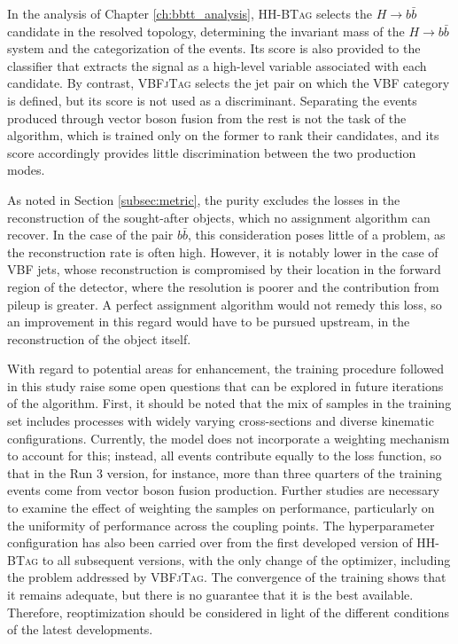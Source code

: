 In the analysis of Chapter \ref{ch:bbtt_analysis}, \textsc{HH-BTag} selects the $H\to b\bar{b}$ candidate in the resolved topology, determining the invariant mass of the $H\to b\bar{b}$ system and the categorization of the events. Its score is also provided to the classifier that extracts the signal as a high-level variable associated with each candidate. By contrast, \textsc{VBFjTag} selects the jet pair on which the VBF category is defined, but its score is not used as a discriminant. Separating the events produced through vector boson fusion from the rest is not the task of the algorithm, which is trained only on the former to rank their candidates, and its score accordingly provides little discrimination between the two production modes.


As noted in Section \ref{subsec:metric}, the purity excludes the losses in the reconstruction of the sought-after objects, which no assignment algorithm can recover. In the case of the pair $b\bar{b}$, this consideration poses little of a problem, as the reconstruction rate is often high. However, it is notably lower in the case of VBF jets, whose reconstruction is compromised by their location in the forward region of the detector, where the resolution is poorer and the contribution from pileup is greater. A perfect assignment algorithm would not remedy this loss, so an improvement in this regard would have to be pursued upstream, in the reconstruction of the object itself.

With regard to potential areas for enhancement, the training procedure followed in this study raise some open questions that can be explored in future iterations of the algorithm. First, it should be noted that the mix of samples in the training set includes processes with widely varying cross-sections and diverse kinematic configurations. Currently, the model does not incorporate a weighting mechanism to account for this; instead, all events contribute equally to the loss function, so that in the Run 3 version, for instance, more than three quarters of the training events come from vector boson fusion production. Further studies are necessary to examine the effect of weighting the samples on performance, particularly on the uniformity of performance across the coupling points. The hyperparameter configuration has also been carried over from the first developed version of \textsc{HH-BTag} to all subsequent versions, with the only change of the optimizer, including the problem addressed by \textsc{VBFjTag}. The convergence of the training shows that it remains adequate, but there is no guarantee that it is the best available. Therefore, reoptimization should be considered in light of the different conditions of the latest developments.\medskip

